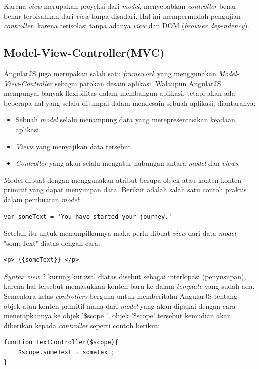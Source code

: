 	Karena \textit{view} merupakan proyeksi dari \textit{model}, menyebabkan \textit{controller} benar-benar terpisahkan dari \textit{view} tanpa disadari. Hal ini mempermudah pengujian \textit{controller}, karena terisolasi tanpa adanya \textit{view} dan DOM (\textit{browser dependency}).
	
\subsection{Model-View-Controller(MVC)}
\label{sub: mvcAngular}

	AngularJS \cite{green2013angularjs} juga merupakan salah satu \textit{framework} yang menggunakan  \textit{Model-View-Controller} sebagai patokan desain aplikasi. Walaupun AngularJS mempunyai banyak flexibilitas dalam membangun aplikasi, tetapi akan ada beberapa hal yang selalu dijumpai dalam mendesain sebuah aplikasi, diantaranya:
	\begin{itemize}
		\item Sebuah \textit{model} selalu menampung data yang merepresentasikan keadaan aplikasi.
		\item \textit{Views} yang menyajikan data tersebut.
		\item \textit{Controller} yang akan selalu mengatur hubungan antara \textit{model} dan \textit{views}.
	\end{itemize}
	
	Model dibuat dengan menggunakan atribut berupa objek atau konten-konten primitif yang dapat menyimpan data. Berikut adalah salah satu contoh praktis dalam pembuatan \textit{model}:
\begin{lstlisting}[caption= Model berupa variabel]
var someText = 'You have started your journey.'
\end{lstlisting}
	Setelah itu untuk menampilkannya maka perlu dibuat \textit{view} dari data \textit{model} "someText" diatas dengan cara:
\begin{lstlisting}[caption= Menampilkan model]
<p> {{someText}} </p>
\end{lstlisting}
	\textit{Syntax view} 2 kurung kurawal diatas disebut sebagai interlopasi (penyusupan), karena hal tersebut memasukkan konten baru ke dalam \textit{template} yang sudah ada.\\
	Sementara kelas \textit{controllers} berguna untuk memberitahu AngularJS tentang objek atau konten primitif mana dari \textit{model} yang akan dipakai dengan cara menetapkannya ke objek '\$scope ', objek '\$scope' tersebut kemudian akan diberikan kepada \textit{controller} seperti contoh berikut:
\begin{lstlisting}[caption= Controller , label= listController]
function TextController($scope){
	$scope.someText = someText;
}
\end{lstlisting}
	
